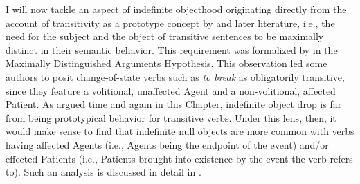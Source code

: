 I will now tackle an aspect of indefinite objecthood originating directly from the account of transitivity as a prototype concept by \textcite{HopperThompson1980} and later literature, i.e., the need for the subject and the object of transitive sentences to be maximally distinct in their semantic behavior. This requirement was formalized by \textcite[30]{Naess2007} in the Maximally Distinguished Arguments Hypothesis. This observation led some authors to posit change-of-state verbs such as \textit{to break} as obligatorily transitive, since they feature a volitional, unaffected Agent and a non-volitional, affected Patient. As argued time and again in this Chapter, indefinite object drop is far from being prototypical behavior for transitive verbs. Under this lens, then, it would make sense to find that indefinite null objects are more common with verbs having affected Agents (i.e., Agents being the endpoint of the event) and/or effected Patients (i.e., Patients brought into existence by the event the verb refers to). Such an analysis is discussed in detail in \textcite{Naess2007}.\\
